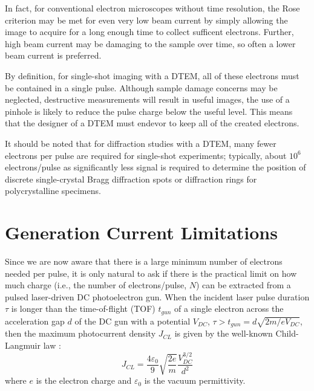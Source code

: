 In fact, for conventional electron microscopes without time resolution, the Rose criterion may be met for even very low beam current by simply allowing the image to acquire for a long enough time to collect sufficent electrons.
Further, high beam current may be damaging to the sample over time, so often a lower beam current is preferred.

By definition, for single-shot imaging with a DTEM, all of these electrons must be contained in a single pulse.
Although sample damage concerns may be neglected, destructive measurements will result in useful images, the use of a pinhole is likely to reduce the pulse charge below the useful level.
This means that the designer of a DTEM must endevor to keep all of the created electrons.

It should be noted that for diffraction studies with a DTEM, many fewer electrons per pulse are required for single-shot experiments; typically, about $10^6$ electrons/pulse \cite{armstrong_practical_2007} as significantly less signal is required to determine the position of discrete single-crystal Bragg diffraction spots or diffraction rings for polycrystalline specimens.

\section{Generation Current Limitations} \label{sec:childs_law}

Since we are now aware that there is a large minimum number of electrons needed per pulse, it is only natural to ask if there is the practical limit on how much charge (i.e., the number of electrons/pulse, $N$) can be extracted from a pulsed laser-driven DC photoelectron gun.
When the incident laser pulse duration $\tau$ is longer than the time-of-flight (TOF) $t_{gun}$ of a single electron across the acceleration gap $d$ of the DC gun with a potential $V_{DC}$, $\tau > t_{gun} = d \sqrt{2m/eV_{DC}}$, then the maximum photocurrent density $J_{CL}$ is given by the well-known Child-Langmuir law \cite{child_discharge_1911,langmuir_effect_1923}:
\begin{equation}
  J_{CL} = \frac{4 \varepsilon_0}{9} \sqrt{\frac{2e}{m}} \frac{V_{DC}^{3/2}}{d^2}
\end{equation}
where $e$ is the electron charge and $\varepsilon_0$ is the vacuum permittivity.

